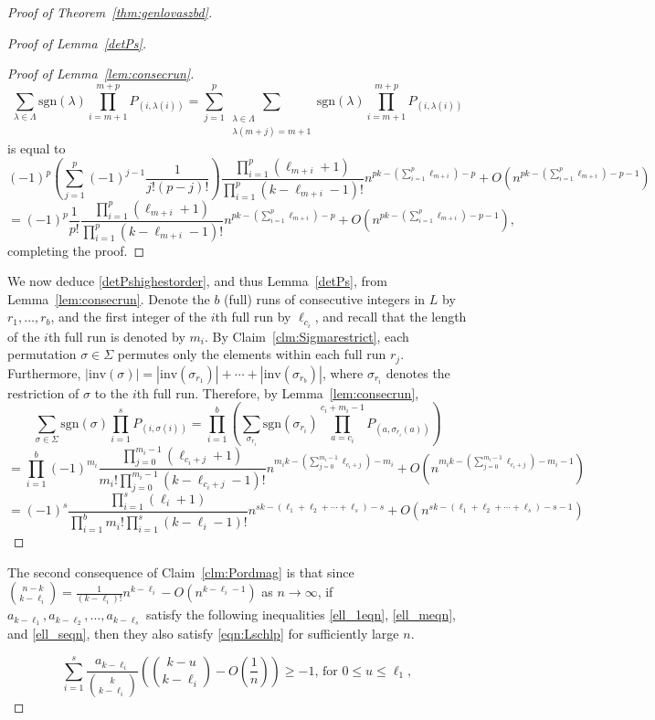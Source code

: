 \documentclass[11pt]{article}
\theoremstyle{definition}
\theoremstyle{remark}
\begin{document}
\begin{proof}[Proof of Theorem~\ref{thm:genlovaszbd}]
\begin{proof}[Proof of Lemma~\ref{detPs}]
\begin{proof}[Proof of Lemma~\ref{lem:consecrun}]
\[\sum_{\lambda\in \Lambda}\text{sgn}(\lambda)\prod_{i=m+1}^{m+p}P_{(i,\lambda(i))}  = \sum_{j=1}^p\sum_{\substack{\lambda\in \Lambda \\ \lambda(m+j) = m+1}} \text{sgn}(\lambda)\prod_{i=m+1}^{m+p}P_{(i,\lambda(i))}\]
is equal to
\[ (-1)^p\left(\sum_{j=1}^p(-1)^{j-1}\frac{1}{j!(p-j)!}\right)\frac{\prod_{i=1}^p(\ell_{m+i}+1)}{\prod_{i=1}^p(k-\ell_{m+i}-1)!}n^{pk-(\sum_{i=1}^p\ell_{m+i})-p} +O(n^{pk-(\sum_{i=1}^p\ell_{m+i})-p-1})\]
\[= (-1)^p\frac{1}{p!}\frac{\prod_{i=1}^p(\ell_{m+i}+1)}{\prod_{i=1}^p(k-\ell_{m+i}-1)!}n^{pk-(\sum_{i=1}^p\ell_{m+i})-p} +O(n^{pk-(\sum_{i=1}^p\ell_{m+i})-p-1}),\]
completing the proof.
\end{proof}
We now deduce \eqref{detPshighestorder}, and thus Lemma~\ref{detPs}, from Lemma~\ref{lem:consecrun}. Denote the $b$ (full) runs of consecutive integers in $L$ by $r_1, \ldots ,r_b$, and the first integer of the $i$th full run by $\ell_{c_i}$, and recall that the length of the $i$th full run is denoted by $m_i$. By Claim~\ref{clm:Sigmarestrict}, each permutation $\sigma \in \Sigma$ permutes only the elements within each full run $r_j$. Furthermore, $|\text{inv}(\sigma)| = |\text{inv}(\sigma_{r_1})| + \cdots + |\text{inv}(\sigma_{r_b})|$, where $\sigma_{r_i}$ denotes the restriction of $\sigma$ to the $i$th full run. Therefore, by Lemma~\ref{lem:consecrun},
\[\sum_{\sigma\in\Sigma}\text{sgn}(\sigma)\prod_{i=1}^sP_{(i,\sigma(i))} = \prod_{i=1}^b\left(\sum_{\sigma_{r_i}}\text{sgn}(\sigma_{r_i})\prod_{a=c_i}^{c_i+m_i-1}P_{(a,\sigma_{r_i}(a))}\right)\]
\[= \prod_{i=1}^b(-1)^{m_i}\frac{\prod_{j=0}^{m_i-1}(\ell_{c_i+j}+1)}{m_i!\prod_{j=0}^{m_i-1}(k-\ell_{c_i+j}-1)!}n^{m_ik-(\sum_{j=0}^{m_i-1}\ell_{c_i+j})-m_i} +O(n^{m_ik-(\sum_{j=0}^{m_i-1}\ell_{c_i+j})-m_i-1}) \] 
\[ = (-1)^s\frac{\prod_{i=1}^s(\ell_i+1)}{ \prod_{i=1}^bm_i!  \prod_{i=1}^s(k-\ell_i-1)!}n^{sk-(\ell_1+\ell_2+\cdots + \ell_s)-s} + O(n^{sk-(\ell_1+\ell_2+\cdots + \ell_s)-s-1})\]
\end{proof}

The second consequence of Claim~\ref{clm:Pordmag} is that since $\binom{n-k}{k-\ell_i} = \frac{1}{(k-\ell_i)!}n^{k-\ell_i} - O(n^{k-\ell_i-1})$ as $n\rightarrow \infty$, if $a_{k-\ell_1}, a_{k-\ell_2}, \ldots, a_{k-\ell_s}$ satisfy the following inequalities \eqref{ell_1eqn}, \eqref{ell_meqn}, and \eqref{ell_seqn}, then they also satisfy \eqref{eqn:Lschlp} for sufficiently large $n$. 
 
\begin{equation}\label{ell_1eqn}
 \sum_{i=1}^s\frac{a_{k-\ell_i}}{\binom{k}{k-\ell_i}}\left(\binom{k-u}{k-\ell_i}-O\left(\frac{1}{n}\right)\right) \ge -1,\, \text{for } 0\le u\le \ell_1,
 \end{equation}
 

\end{proof}
\end{document}
